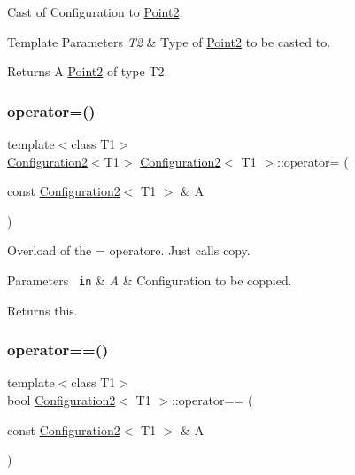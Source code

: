 Cast of Configuration to \mbox{\hyperlink{class_point2}{Point2}}. 


\begin{DoxyTemplParams}{Template Parameters}
{\em T2} & Type of \mbox{\hyperlink{class_point2}{Point2}} to be casted to. \\
\hline
\end{DoxyTemplParams}
\begin{DoxyReturn}{Returns}
A \mbox{\hyperlink{class_point2}{Point2}} of type T2. 
\end{DoxyReturn}
\mbox{\label{class_configuration2_a9ef2f57ddcc1f0c8117a9ed2f13141aa}} 
\subsubsection{\texorpdfstring{operator=()}{operator=()}}
{\footnotesize\ttfamily template$<$class T1$>$ \\
\mbox{\hyperlink{class_configuration2}{Configuration2}}$<$T1$>$ \mbox{\hyperlink{class_configuration2}{Configuration2}}$<$ T1 $>$\+::operator= (\begin{DoxyParamCaption}\item[{const \mbox{\hyperlink{class_configuration2}{Configuration2}}$<$ T1 $>$ \&}]{A }\end{DoxyParamCaption})\hspace{0.3cm}{\ttfamily [inline]}}



Overload of the = operatore. Just calls {\ttfamily copy}. 


\begin{DoxyParams}[1]{Parameters}
\mbox{\texttt{ in}}  & {\em A} & Configuration to be coppied. \\
\hline
\end{DoxyParams}
\begin{DoxyReturn}{Returns}
this. 
\end{DoxyReturn}
\mbox{\label{class_configuration2_a7dda6b86ded2376a78a7f3d9f2811740}} 
\subsubsection{\texorpdfstring{operator==()}{operator==()}}
{\footnotesize\ttfamily template$<$class T1$>$ \\
bool \mbox{\hyperlink{class_configuration2}{Configuration2}}$<$ T1 $>$\+::operator== (\begin{DoxyParamCaption}\item[{const \mbox{\hyperlink{class_configuration2}{Configuration2}}$<$ T1 $>$ \&}]{A }\end{DoxyParamCaption})\hspace{0.3cm}{\ttfamily [inline]}}




